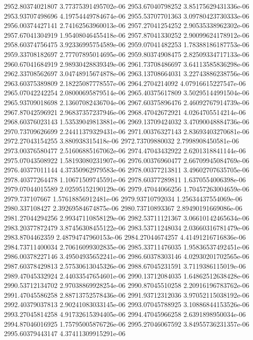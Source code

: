 {2952.80374021807 3.77375391495702e-06
2953.67040798252 3.85175629431336e-06
2953.93707498696 4.19754449784674e-06
2955.53707701363 3.09780423730333e-06
2956.00374427141 2.74162563960013e-06
2957.27041254252 2.90535338962302e-06
2957.67041304919 1.95408046455418e-06
2957.87041330252 2.90099624178912e-06
2958.60374756475 3.92336995754589e-06
2959.07041482253 1.78388186187753e-06
2959.33708182697 2.77707895014695e-06
2959.80374908475 2.82509334717133e-06
2960.67041684919 2.98930428839349e-06
2961.73708486697 3.64113585836298e-06
2962.33708562697 3.04748915674878e-06
2963.13708664031 3.22743886238756e-06
2963.60375389809 2.18225087778557e-06
2964.2704214092 4.07916615227547e-06
2965.07042242254 2.08000695879514e-06
2965.40375617809 3.50295144991504e-06
2965.93709018698 2.13607082436704e-06
2967.60375896476 2.46092767914739e-06
2967.87042596921 2.96837357237946e-06
2968.47042672921 4.0264705514214e-06
2968.60376023143 1.53539049813881e-06
2969.13709424032 3.47090048884736e-06
2970.73709626699 2.24411379329431e-06
2971.00376327143 2.83693403270681e-06
2972.27043154255 3.880938315418e-06
2972.73709880032 2.7998908450581e-06
2973.00376580477 2.51606885167062e-06
2974.47043432922 2.6201318841144e-06
2975.07043508922 1.58193080231907e-06
2976.00376960477 2.66709945084769e-06
2976.40377011144 4.37350962979583e-06
2978.00377213811 3.49602707635705e-06
2978.40377264478 1.10671509745591e-06
2978.60377289811 1.6370554006398e-06
2979.07044015589 2.02595152190129e-06
2979.47044066256 1.70457263004659e-06
2979.737107667 1.57618856912481e-06
2979.93710792034 1.25634437554069e-06
2980.337108427 2.39269584674875e-06
2980.73710893367 2.89490191669086e-06
2981.27044294256 2.99347110858129e-06
2982.53711121367 3.06610142465634e-06
2983.20377872479 3.87456308455122e-06
2983.53711248034 2.03660316781479e-06
2983.8704462359 2.48794747960153e-06
2984.27044674257 4.41491216716836e-06
2984.73711400034 2.70616099302835e-06
2985.33711476035 1.95836537492451e-06
2986.00378227146 3.49504935652241e-06
2986.60378303146 4.02930201702565e-06
2987.60378429813 2.57530613045326e-06
2988.67045231591 3.7119386115019e-06
2989.47045332924 2.44033547654601e-06
2990.13712084035 1.64862512638428e-06
2990.53712134702 2.97038869928254e-06
2990.87045510258 2.20916196783762e-06
2991.47045586258 2.88713752578436e-06
2991.93712312036 3.97052115038192e-06
2992.40379037813 2.90241083033145e-06
2993.07045788925 3.10886844153526e-06
2993.27045814258 4.91732615394405e-06
2994.47045966258 2.6391898950034e-06
2994.87046016925 1.75795005876726e-06
2995.27046067592 3.84955736231357e-06
2995.60379443147 4.37411309915291e-06
}
